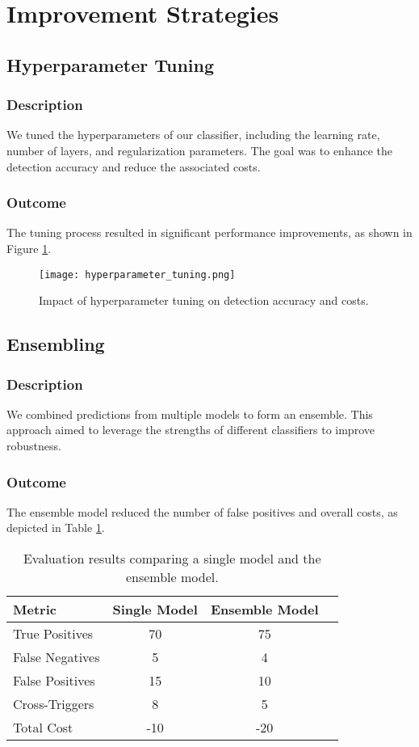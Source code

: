 \section{Improvement Strategies}
\subsection{Hyperparameter Tuning}
\subsubsection{Description}
We tuned the hyperparameters of our classifier, including the learning rate, number of layers, and regularization parameters. The goal was to enhance the detection accuracy and reduce the associated costs.

\subsubsection{Outcome}
The tuning process resulted in significant performance improvements, as shown in Figure \ref{fig:hyperparameter_tuning}.

\begin{figure}[h]
\centering
\texttt{[image: hyperparameter\_tuning.png]}
\caption{Impact of hyperparameter tuning on detection accuracy and costs.}
\label{fig:hyperparameter_tuning}
\end{figure}

\subsection{Ensembling}
\subsubsection{Description}
We combined predictions from multiple models to form an ensemble. This approach aimed to leverage the strengths of different classifiers to improve robustness.

\subsubsection{Outcome}
The ensemble model reduced the number of false positives and overall costs, as depicted in Table \ref{tab:ensemble_results}.

\begin{table}[h]
\centering
\begin{tabular}{lccc}
\toprule
Metric & Single Model & Ensemble Model \\
\midrule
True Positives & 70 & 75 \\
False Negatives & 5 & 4 \\
False Positives & 15 & 10 \\
Cross-Triggers & 8 & 5 \\
Total Cost & -10 & -20 \\
\bottomrule
\end{tabular}
\caption{Evaluation results comparing a single model and the ensemble model.}
\label{tab:ensemble_results}
\end{table}

